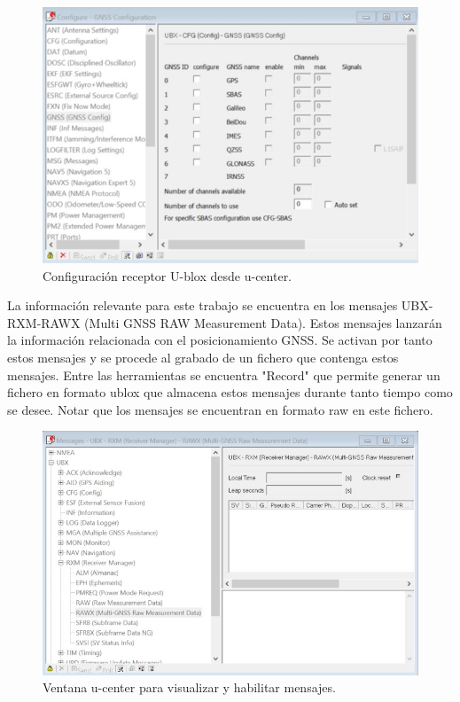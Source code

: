 \begin{figure}
	\centering
	\includegraphics[width=1\textwidth]{imagenes/gnssconfig.jpg}
	\caption{\label{fig1}Configuración receptor U-blox desde u-center.}
\end{figure}

La información relevante para este trabajo se encuentra en los mensajes UBX-RXM-RAWX (Multi GNSS RAW Measurement Data). Estos mensajes lanzarán la información relacionada con el posicionamiento GNSS. Se activan por tanto estos mensajes y se procede al grabado de un fichero que contenga estos mensajes. Entre las herramientas se encuentra "Record" que permite generar un fichero en formato ublox que almacena estos mensajes durante tanto tiempo como se desee. Notar que los mensajes se encuentran en formato raw en este fichero. \newline

\begin{figure}
	\centering
	\includegraphics[width=1\textwidth]{imagenes/messagesview.jpg}
	\caption{\label{fig1}Ventana u-center para visualizar y habilitar mensajes.}
\end{figure}


